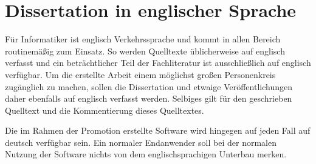 \documentclass[paper=a4,fontsize=11pt,parskip=half]{scrartcl}
\begin{document}
\newpage

\section{Dissertation in englischer Sprache}

Für Informatiker ist englisch Verkehrssprache und kommt in allen Bereich routinemäßig zum Einsatz. So werden Quelltexte üblicherweise auf englisch verfasst und ein beträchtlicher Teil der Fachliteratur ist ausschließlich auf englisch verfügbar. Um die erstellte Arbeit einem möglichst großen Personenkreis zugänglich zu machen, sollen die Dissertation und etwaige Veröffentlichungen daher ebenfalls  auf englisch verfasst werden. Selbiges gilt für den geschrieben Quelltext und die Kommentierung dieses Quelltextes.

Die im Rahmen der Promotion erstellte Software wird hingegen auf jeden Fall auf deutsch verfügbar sein. Ein normaler Endanwender soll bei der normalen Nutzung der Software nichts von dem englischsprachigen Unterbau merken.
\end{document}
